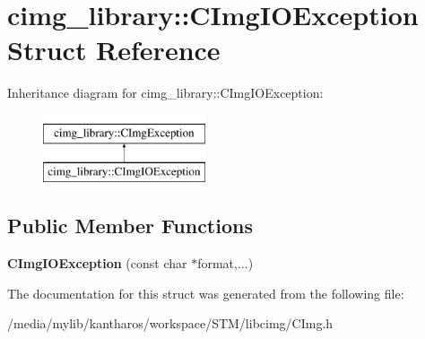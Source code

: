 \hypertarget{structcimg__library_1_1_c_img_i_o_exception}{
\section{cimg\_\-library::CImgIOException Struct Reference}
\label{structcimg__library_1_1_c_img_i_o_exception}
}
Inheritance diagram for cimg\_\-library::CImgIOException:\begin{figure}[H]
\begin{center}
\leavevmode
\includegraphics[height=2.000000cm]{structcimg__library_1_1_c_img_i_o_exception}
\end{center}
\end{figure}
\subsection*{Public Member Functions}
\begin{DoxyCompactItemize}
\item 
\hypertarget{structcimg__library_1_1_c_img_i_o_exception_a055e2ead04a81ae630b616bac1cb265e}{
{\bfseries CImgIOException} (const char $\ast$format,...)}
\label{structcimg__library_1_1_c_img_i_o_exception_a055e2ead04a81ae630b616bac1cb265e}

\end{DoxyCompactItemize}


The documentation for this struct was generated from the following file:\begin{DoxyCompactItemize}
\item 
/media/mylib/kantharos/workspace/STM/libcimg/CImg.h\end{DoxyCompactItemize}
